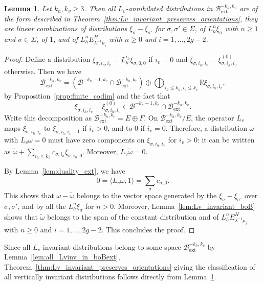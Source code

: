 \documentclass[JEP,XML,SOM,Unicode]{cedram}
\newcommand{\ext}{\mathrm{ext}}
\newcommand{\boB}{\mathcal{B}}
\newcommand{\R}{\mathbb{R}}
\newtheorem{lem}[thm]{Lemma}
\theoremstyle{definition}
\numberwithin{equation}{section}
\begin{document}
\begin{lem}
\label{lem:Lvinv_description} Let $k_h, k_v \geq 3$. Then all
$L_v$-annihilated distributions in $\boB^{-k_h, k_v}_{\ext}$ are of the form
described in Theorem~\ref{thm:Lv_invariant_preserves_orientations}, \ie they are linear combinations of distributions $\xi_\sigma - \xi_{\sigma'}$
for $\sigma,\sigma'\in \Sigma$, of $L_h^n \xi_\sigma$ with $n\geq 1$ and
$\sigma\in \Sigma$, of $1$, and of $L_h^n E^H_{\lambda^{-1}\mu_i}$ with
$n\geq 0$ and $i=1,\dotsc, 2g-2$.
\end{lem}
\begin{proof}
Define a distribution $\xi_{\sigma, i_h, i_v} = L_h^{i_h} \xi_{\sigma, 0, 0}$
if $i_v = 0$ and $\xi_{\sigma, i_h, i_v} = \xi^{(0)}_{\sigma, i_h, i_v}$
otherwise. Then we have
\begin{equation*}
\boB^{-k_h, k_v}_{\ext} = (\boB^{-k_h-1, k_v} \cap \boB^{-k_h, k_v}_{\ext}) \oplus \bigoplus_{i_h \leq k_h, i_v\leq k_v} \R \xi_{\sigma, i_h, i_v},
\end{equation*}
by Proposition~\ref{prop:finite_codim} and the fact that
\[
\xi_{\sigma, i_h,
i_v} - \xi^{(0)}_{\sigma, i_h, i_v} \in \boB^{-k_h-1, k_v} \cap \boB^{-k_h,
k_v}_{\ext}.
\]
Write this decomposition as $\boB^{-k_h, k_v}_{\ext} = E \oplus
F$. On $\boB^{-k_h, k_v}_{\ext} / E$, the operator $L_v$ maps $\xi_{\sigma,
i_h, i_v}$ to $\xi_{\sigma, i_h, i_v-1}$ if $i_v > 0$, and to $0$ if $i_v=0$.
Therefore, a distribution $\omega$ with $L_v \omega = 0$ must have zero
components on $\xi_{\sigma, i_h, i_v}$ for $i_v>0$: it can be written as
$\tilde \omega + \sum_{i_h \leq k_h} c_{\sigma, i_h} \xi_{\sigma, i_h, 0}$.
Moreover, $L_v \tilde \omega = 0$.

By Lemma~\ref{lem:duality_ext}, we have
\begin{equation*}
0 = \langle L_v \omega, 1 \rangle = \sum_{\sigma} c_{\sigma, 0}.
\end{equation*}
This shows that $\omega -\tilde \omega$ belongs to the vector space generated
by the $\xi_\sigma-\xi_{\sigma'}$ over $\sigma, \sigma'$, and by all the
$L_h^n \xi_\sigma$ for $n>0$. Moreover, Lemma~\ref{lem:Lv_invariant_boB}
shows that $\tilde\omega$ belongs to the span of the constant distribution
and of $L_h^n E^H_{\lambda^{-1}\mu_i}$ with $n\geq 0$ and $i=1,\dotsc, 2g-2$.
This concludes the proof.
\end{proof}

Since all $L_v$-invariant distributions belong to some space $\boB^{-k_h,
k_v}_{\ext}$ by Lemma~\ref{lem:all_Lvinv_in_boBext},
Theorem~\ref{thm:Lv_invariant_preserves_orientations} giving the
classification of all vertically invariant distributions follows directly
from Lemma~\ref{lem:Lvinv_description}.
\end{document}

